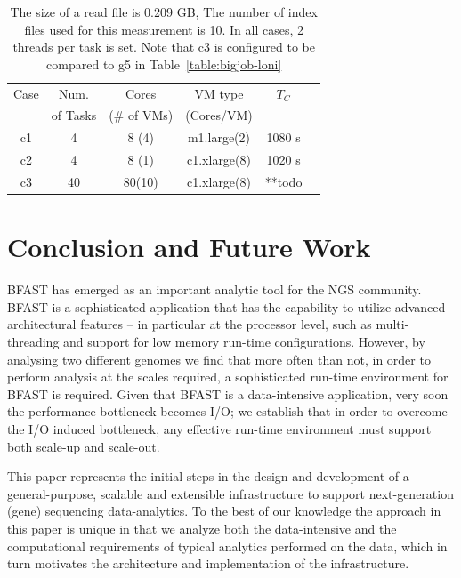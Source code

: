\documentclass{acm_proc_article-sp}
\begin{document}
 \begin{table}
 \small
 \begin{tabular}{|c|c|c|c|c|c|} 
 \hline 
 Case& Num. &  Cores  & VM type  &  $T_C$  \\ 
      & of Tasks & (\# of VMs) & (Cores/VM)  & \\ 
\hline
c1 &  4 &  8 (4) & m1.large(2) & 1080 s \\
c2 & 4 & 8 (1)  & c1.xlarge(8)  &1020 s \\ \hline
c3 & 40 & 80(10) &  c1.xlarge(8) &  **todo \\
 \hline 
 \end{tabular}

 
 
 \caption{ The size of a read file is  0.209 GB, The number of index 
 files used for this measurement is 10. In all cases, 2 threads per task is set. Note that c3 is configured to be compared to g5 in Table~\ref{table:bigjob-loni}}
 \label{table:cloud-VM} 

\end{table}



\section{Conclusion and Future Work}

BFAST has emerged as an important analytic tool for the NGS
community. BFAST is a sophisticated application that has the
capability to utilize advanced architectural features -- in particular
at the processor level, such as multi-threading and support for low
memory run-time configurations. However, by analysing two different
genomes we find that more often than not, in order to perform analysis
at the scales required, a sophisticated run-time environment for BFAST
is required. Given that BFAST is a data-intensive application, very
soon the performance bottleneck becomes I/O; we establish that in
order to overcome the I/O induced bottleneck, any effective run-time
environment must support both scale-up and scale-out. 

This paper represents the initial steps in the design and development
of a general-purpose, scalable and extensible infrastructure to
support next-generation (gene) sequencing data-analytics. To the best
of our knowledge the approach in this paper is unique in that we
analyze both the data-intensive and the computational requirements of
typical analytics performed on the data, which in turn motivates the
architecture and implementation of the infrastructure. 
\end{document}
